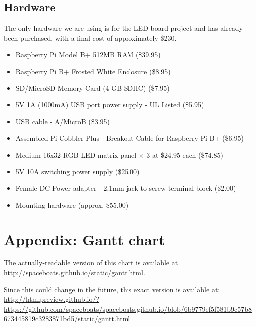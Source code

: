 \documentclass[12pt]{article}
\begin{document}
\subsection{Hardware}
The only hardware we are using is for the LED board project and has already been purchased, with a final cost of approximately \$230.
\begin{itemize}
\item Raspberry Pi Model B+ 512MB RAM (\$39.95)
\item Raspberry Pi B+ Frosted White Enclosure (\$8.95)
\item SD/MicroSD Memory Card (4 GB SDHC) (\$7.95)
\item 5V 1A (1000mA) USB port power supply - UL Listed (\$5.95)
\item USB cable - A/MicroB (\$3.95)
\item Assembled Pi Cobbler Plus - Breakout Cable for Raspberry Pi B+ (\$6.95)
\item Medium 16x32 RGB LED matrix panel × 3 at \$24.95 each (\$74.85)
\item 5V 10A switching power supply (\$25.00)
\item Female DC Power adapter - 2.1mm jack to screw terminal block (\$2.00)
\item Mounting hardware (approx. \$55.00)
\end{itemize}

\pagebreak

\section{Appendix: Gantt chart}
\label{app:gantt}

The actually-readable version of this chart is available at \url{http://spaceboats.github.io/static/gantt.html}.

Since this could change in the future, this exact version is available at: \\
\url{http://htmlpreview.github.io/?https://github.com/spaceboats/spaceboats.github.io/blob/6b9779ef5f581b9c57b8673445819c3283871bd5/static/gantt.html}
\end{document}
